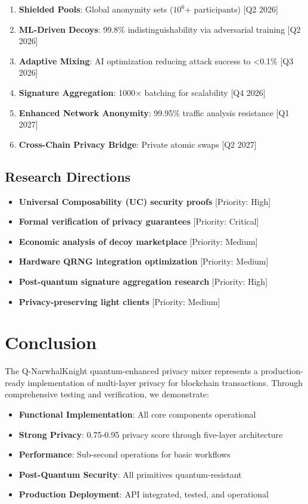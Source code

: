 \documentclass[12pt,a4paper]{article}
\begin{document}
\begin{enumerate}
\item \textbf{Shielded Pools}: Global anonymity sets ($10^6$+ participants) [Q2 2026]
\item \textbf{ML-Driven Decoys}: 99.8\% indistinguishability via adversarial training [Q2 2026]
\item \textbf{Adaptive Mixing}: AI optimization reducing attack success to <0.1\% [Q3 2026]
\item \textbf{Signature Aggregation}: 1000× batching for scalability [Q4 2026]
\item \textbf{Enhanced Network Anonymity}: 99.95\% traffic analysis resistance [Q1 2027]
\item \textbf{Cross-Chain Privacy Bridge}: Private atomic swaps [Q2 2027]
\end{enumerate}

\subsection{Research Directions}

\begin{itemize}
\item \textbf{Universal Composability (UC) security proofs} [Priority: High]
\item \textbf{Formal verification of privacy guarantees} [Priority: Critical]
\item \textbf{Economic analysis of decoy marketplace} [Priority: Medium]
\item \textbf{Hardware QRNG integration optimization} [Priority: Medium]
\item \textbf{Post-quantum signature aggregation research} [Priority: High]
\item \textbf{Privacy-preserving light clients} [Priority: Medium]
\end{itemize}

\section{Conclusion}

The Q-NarwhalKnight quantum-enhanced privacy mixer represents a production-ready implementation of multi-layer privacy for blockchain transactions. Through comprehensive testing and verification, we demonstrate:

\begin{itemize}
\item \textbf{Functional Implementation}: All core components operational
\item \textbf{Strong Privacy}: 0.75-0.95 privacy score through five-layer architecture
\item \textbf{Performance}: Sub-second operations for basic workflows
\item \textbf{Post-Quantum Security}: All primitives quantum-resistant
\item \textbf{Production Deployment}: API integrated, tested, and operational
\end{itemize}
\end{document}
